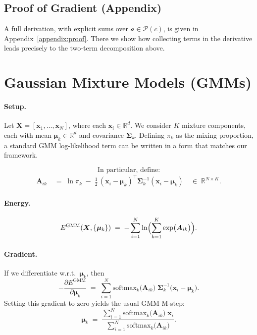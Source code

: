 \documentclass{article}
\begin{document}
\subsection{Proof of Gradient (Appendix)}
A full derivation, with explicit sums over \(\mathcal{a} \in \mathcal{P}(c)\), is given in Appendix~\ref{appendix:proof}.  There we show how collecting terms in the derivative leads precisely to the two-term decomposition above.

\section{Gaussian Mixture Models (GMMs)}
\paragraph{Setup.}
Let \(\bm{X} = [\bm{x}_1, \ldots, \bm{x}_N]\), where each \(\bm{x}_i \in \mathbb{R}^d\). 
We consider \(K\) mixture components, each with mean \(\bm{\mu}_k \in \mathbb{R}^d\) and covariance \(\bm{\Sigma}_k\).  Defining \(\pi_k\) as the mixing proportion, a standard GMM log-likelihood term can be written in a form that matches our framework.

\[
\text{In particular, define:}
\]
\[
\begin{aligned}
\bm{A}_{ik}
&\;=\;
\ln \pi_k 
\;-\;\tfrac{1}{2}\,(\bm{x}_i - \bm{\mu}_k)^\top \bm{\Sigma}_k^{-1}(\bm{x}_i - \bm{\mu}_k)
\quad\in\;\mathbb{R}^{N\times K}.
\end{aligned}
\]

\paragraph{Energy.}
\[
E^{\mathrm{GMM}}(\bm{X}, \{\bm{\mu}_k\})
\;=\;
-\sum_{i=1}^N 
\ln \Bigl(\sum_{k=1}^K 
\exp\bigl(\bm{A}_{ik}\bigr)\Bigr).
\]

\paragraph{Gradient.}
If we differentiate w.r.t.\ \(\bm{\mu}_k\), then
\[
-\frac{\partial E^{\mathrm{GMM}}}{\partial \bm{\mu}_k}
\;=\;
\sum_{i=1}^N 
\text{softmax}_k\!\bigl(\bm{A}_{ik}\bigr)
\;\bm{\Sigma}_k^{-1}\bigl(\bm{x}_i - \bm{\mu}_k\bigr).
\]
Setting this gradient to zero yields the usual GMM M-step:
\[
\bm{\mu}_k
\;=\;
\frac{\sum_{i=1}^N 
\text{softmax}_k\!\bigl(\bm{A}_{ik}\bigr)\;\bm{x}_i}
     {\sum_{i=1}^N
     \text{softmax}_k\!\bigl(\bm{A}_{ik}\bigr)}.
\]
\end{document}
